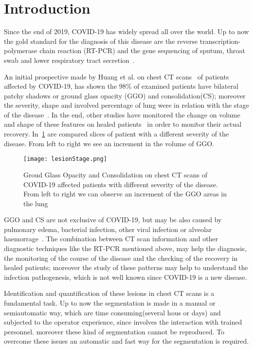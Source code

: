 \documentclass{standalone}
\begin{document}
\chapter*{Introduction}


Since the end of 2019, COVID-19 has widely spread all over the world. Up to now the gold standard for the diagnosis of this disease are the reverse transcription-polymerase chain reaction (RT-PCR) and the gene sequencing of sputum, throat swab and lower respiratory tract secretion~\cite{ART:Zhao}.

An initial prospective made by Huang et al. on chest CT scans~\cite{ART:Huang} of patients affected by COVID-19, has shown the $98\%$ of examined patients have bilateral patchy shadows or ground glass opacity (GGO) and consolidation(CS); moreover the severity, shape and involved percentage of lung were in relation with the stage of the disease~\cite{ART:Bernheim}. In the end, other studies have monitored the change on volume and shape of these features on healed patients~\cite{ART:Ai} in order to monitor their actual recovery. In \figurename\,\ref{fig:HealthVSCovid} are compared slices of patient with a different severity of the disease. From left to right we see an increment in the volume of GGO.

\begin{figure}[h!]
	\centering
	\texttt{[image: lesionStage.png]}
	\caption{Groud Glass Opacity and Consolidation on chest CT scans of COVID-19 affected patients with different severity of the disease. From left to right we can observe an increment of the GGO areas in the lung}\label{fig:HealthVSCovid}
\end{figure} 

GGO and CS are not exclusive of COVID-19, but may be also caused by pulmonary edema, bacterial infection, other viral infection or alveolar haemorrage~\cite{ART:Collins}. The combination between CT scan information and other diagnostic techniques like the RT-PCR mentioned above, may help the diagnosis, the monitoring of the course of the disease and the checking of the recovery in healed patients; moreover the study of these patterns may help to understand the infection pathogenesis, which is not well known since COVID-19 is a new disease.

Identification and quantification of these lesions in chest CT scans is a fundamental task. Up to now the segmentation is made in a manual or semiautomatic way, which are time consuming(several hous or days) and subjected to the operator experience, since involves the interaction with trained personnel. moreover these kind of segmentation cannot be reproduced. To overcome these issues an automatic and fast way for the segmentation is required.
\end{document}
